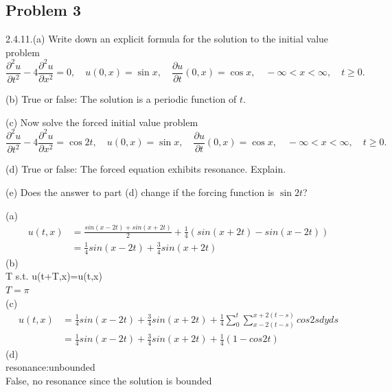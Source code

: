 \subsection*{Problem 3}
2.4.11.(a) Write down an explicit formula for the solution to the initial value problem
$$\frac{\partial^2 u}{\partial t^2} - 4 \frac{\partial^2 u}{\partial x^2} = 0, \quad u(0,x) = \sin x, \quad \frac{\partial u}{\partial t}(0,x) = \cos x, \quad -\infty < x < \infty, \quad t \geq 0.$$

(b) True or false: The solution is a periodic function of $t$.

(c) Now solve the forced initial value problem
$$\frac{\partial^2 u}{\partial t^2} - 4 \frac{\partial^2 u}{\partial x^2} = \cos 2t, \quad u(0,x) = \sin x, \quad \frac{\partial u}{\partial t}(0,x) = \cos x, \quad -\infty < x < \infty, \quad t \geq 0.$$

(d) True or false: The forced equation exhibits resonance. Explain.

(e) Does the answer to part (d) change if the forcing function is $\sin 2t$?
\begin{solution}
    (a)\begin{align*}{}{}
    u(t,x)&=\frac{sin(x-2t)+sin(x+2t)}{2}+\frac{1}{4}(sin(x+2t)-sin(x-2t))\\
    &=\frac{1}{4}sin(x-2t)+\frac{3}{4}sin(x+2t)
    \end{align*}
    (b)\\
    T s.t. u(t+T,x)=u(t,x)\\
    $T=\pi$\\
    (c)\\
    \begin{align*}{}{}
    u(t,x)&=\frac{1}{4}sin(x-2t)+\frac{3}{4}sin(x+2t)+\frac{1}{4}\sum_{0}^{t}\sum_{x-2(t-s)}^{x+2(t-s)}cos2sdyds\\
    &=\frac{1}{4}sin(x-2t)+\frac{3}{4}sin(x+2t)+\frac{1}{4}(1-cos2t)
    \end{align*}
    (d)\\
    resonance:unbounded\\
    False, no resonance since the solution is bounded
\end{solution}
